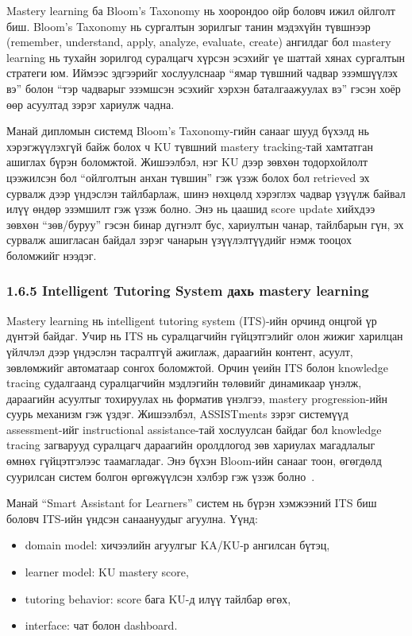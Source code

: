 \documentclass[12pt,A4]{report}
\newcommand{\eng}[1]{#1}
\begin{document}
Mastery learning ба Bloom's Taxonomy нь хоорондоо ойр боловч ижил ойлголт биш. Bloom's Taxonomy нь сургалтын зорилгыг танин мэдэхүйн түвшнээр (\eng{remember}, \eng{understand}, \eng{apply}, \eng{analyze}, \eng{evaluate}, \eng{create}) ангилдаг бол mastery learning нь тухайн зорилгод суралцагч хүрсэн эсэхийг үе шаттай хянах сургалтын стратеги юм. Иймээс эдгээрийг хослуулснаар ``ямар түвшний чадвар эзэмшүүлэх вэ'' болон ``тэр чадварыг эзэмшсэн эсэхийг хэрхэн баталгаажуулах вэ'' гэсэн хоёр өөр асуултад зэрэг хариулж чадна.

Манай дипломын системд Bloom's Taxonomy-гийн санааг шууд бүхэлд нь хэрэгжүүлэхгүй байж болох ч KU түвшний mastery tracking-тай хамтатган ашиглах бүрэн боломжтой. Жишээлбэл, нэг KU дээр зөвхөн тодорхойлолт цээжилсэн бол ``ойлголтын анхан түвшин'' гэж үзэж болох бол retrieved эх сурвалж дээр үндэслэн тайлбарлаж, шинэ нөхцөлд хэрэглэх чадвар үзүүлж байвал илүү өндөр эзэмшилт гэж үзэж болно. Энэ нь цаашид score update хийхдээ зөвхөн ``зөв/буруу'' гэсэн бинар дүгнэлт бус, хариултын чанар, тайлбарын гүн, эх сурвалж ашигласан байдал зэрэг чанарын үзүүлэлтүүдийг нэмж тооцох боломжийг нээдэг.

\subsubsection{1.6.5 Intelligent Tutoring System дахь mastery learning}

Mastery learning нь intelligent tutoring system (ITS)-ийн орчинд онцгой үр дүнтэй байдаг. Учир нь ITS нь суралцагчийн гүйцэтгэлийг олон жижиг харилцан үйлчлэл дээр үндэслэн тасралтгүй ажиглаж, дараагийн контент, асуулт, зөвлөмжийг автоматаар сонгох боломжтой. Орчин үеийн ITS болон knowledge tracing судалгаанд суралцагчийн мэдлэгийн төлөвийг динамикаар үнэлж, дараагийн асуултыг тохируулах нь форматив үнэлгээ, mastery progression-ийн суурь механизм гэж үздэг. Жишээлбэл, ASSISTments зэрэг системүүд assessment-ийг instructional assistance-тай хослуулсан байдаг бол knowledge tracing загварууд суралцагч дараагийн оролдлогод зөв хариулах магадлалыг өмнөх гүйцэтгэлээс таамагладаг. Энэ бүхэн Bloom-ийн санааг тоон, өгөгдөлд суурилсан систем болгон өргөжүүлсэн хэлбэр гэж үзэж болно~\cite{feng2009,corbett1994}.

Манай ``Smart Assistant for Learners'' систем нь бүрэн хэмжээний ITS биш боловч ITS-ийн үндсэн санаануудыг агуулна. Үүнд:

\begin{itemize}
    \item domain model: хичээлийн агуулгыг KA/KU-р ангилсан бүтэц,
    \item learner model: KU mastery score,
    \item tutoring behavior: score бага KU-д илүү тайлбар өгөх,
    \item interface: чат болон dashboard.
\end{itemize}
\end{document}
